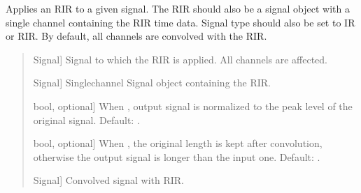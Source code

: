 \documentclass[letterpaper,10pt,english]{sphinxmanual}
\begin{document}
\begin{fulllineitems}
\label{\detokenize{modules/dsptools.room_acoustics:dsptools.room_acoustics.convolve_rir_on_signal}}
\pysigstartsignatures
{}
\pysigstopsignatures
\sphinxAtStartPar
Applies an RIR to a given signal. The RIR should also be a signal object
with a single channel containing the RIR time data. Signal type should
also be set to IR or RIR. By default, all channels are convolved with
the RIR.
\begin{quote}\begin{description}
\begin{description}
\sphinxlineitem{\sphinxstylestrong{signal}}{[}Signal{]}
\sphinxAtStartPar
Signal to which the RIR is applied. All channels are affected.

\sphinxlineitem{\sphinxstylestrong{rir}}{[}Signal{]}
\sphinxAtStartPar
Single\sphinxhyphen{}channel Signal object containing the RIR.

\sphinxlineitem{\sphinxstylestrong{keep\_peak\_level}}{[}bool, optional{]}
\sphinxAtStartPar
When , output signal is normalized to the peak level of
the original signal. Default: .

\sphinxlineitem{\sphinxstylestrong{keep\_length}}{[}bool, optional{]}
\sphinxAtStartPar
When , the original length is kept after convolution, otherwise
the output signal is longer than the input one. Default: .

\end{description}

\begin{description}
\sphinxlineitem{\sphinxstylestrong{new\_sig}}{[}Signal{]}
\sphinxAtStartPar
Convolved signal with RIR.

\end{description}

\end{description}\end{quote}

\end{fulllineitems}
\end{document}
